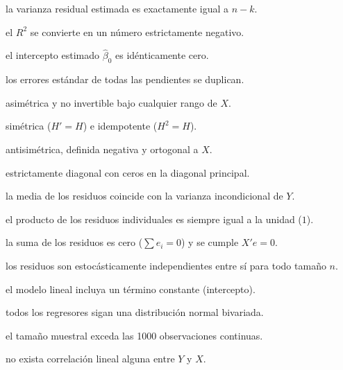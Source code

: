 \begin{opts}
    \item la varianza residual estimada es exactamente igual a $n - k$.
    \item el $R^2$ se convierte en un número estrictamente negativo.
    \item el intercepto estimado $\hat{\beta}_0$ es idénticamente cero.
    \item los errores estándar de todas las pendientes se duplican.
\end{opts}

\begin{opts}
    \item asimétrica y no invertible bajo cualquier rango de $X$.
    \item simétrica ($H' = H$) e idempotente ($H^2 = H$).
    \item antisimétrica, definida negativa y ortogonal a $X$.
    \item estrictamente diagonal con ceros en la diagonal principal.
\end{opts}

\begin{opts}
    \item la media de los residuos coincide con la varianza incondicional de $Y$.
    \item el producto de los residuos individuales es siempre igual a la unidad ($1$).
    \item la suma de los residuos es cero ($\sum e_i = 0$) y se cumple $X'e = 0$.
    \item los residuos son estocásticamente independientes entre sí para todo tamaño $n$.
\end{opts}

\begin{opts}
    \item el modelo lineal incluya un término constante (intercepto).
    \item todos los regresores sigan una distribución normal bivariada.
    \item el tamaño muestral exceda las 1000 observaciones continuas.
    \item no exista correlación lineal alguna entre $Y$ y $X$.
\end{opts}


